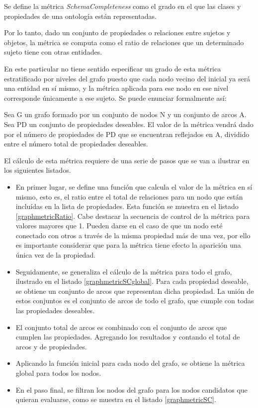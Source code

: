 

Se define la métrica \textit{SchemaCompleteness} como el grado en el que las
clases y propiedades de una ontología están representadas. 

Por lo
tanto, dado un conjunto de propiedades o relaciones entre sujetos y objetos, la
métrica se computa como el ratio de relaciones que un determinado sujeto tiene
con otras entidades. 

En este particular no tiene sentido especificar un grado de esta métrica
estratificado por niveles del grafo puesto que cada nodo vecino del inicial ya
será una entidad en sí mismo, y la métrica aplicada para ese nodo en ese nivel
corresponde únicamente a ese sujeto. Se puede enunciar formalmente así: 

Sea G un grafo formado por un conjunto de nodos N y un conjunto de arcos A. Sea PD un conjunto de propiedades deseables. El valor de la
métrica vendrá dado por el número de propiedades de PD que se
encuentran reflejados en A, dividido entre el número total de propiedades
deseables. 

El cálculo de esta métrica requiere de una serie de pasos que se van a ilustrar
en los siguientes listados. 

\begin{itemize}
\item En primer lugar, se define una función que calcula el valor de la métrica en sí
mismo, esto es, el ratio entre el total de relaciones para un nodo que están
incluídas en la lista de propiedades. Esta función se muestra en el listado
\ref{graphmetricRatio}. Cabe destacar la secuencia de control de la métrica para
valores mayores que 1. Pueden darse en el caso de que un nodo esté conectado con
otros a través de la misma propiedad más de una vez, por ello es importante
considerar que para la métrica tiene efecto la aparición una única vez de la
propiedad. 
\item Seguidamente, se generaliza el cálculo de la métrica para todo el grafo,
ilustrado en el listado \ref{graphmetricSCglobal}. Para
cada propiedad deseable, se obtiene un conjunto de arcos que representan dicha
propiedad. La unión de estos conjuntos es el conjunto de arcos de todo el
grafo, que cumple con todas las propiedades deseables. 
\item El conjunto total de arcos es combinado con el conjunto de arcos que cumplen las
propiedades. Agregando los resultados y contando el total de arcos y de
propiedades. 
\item Aplicando la función inicial para cada nodo del grafo, se obtiene la métrica
global para todos los nodos. 
\item En el paso final, se filtran los nodos del grafo para los nodos candidatos que
quieran evaluarse, como se muestra en el listado \ref{graphmetricSC}.

\end{itemize}


